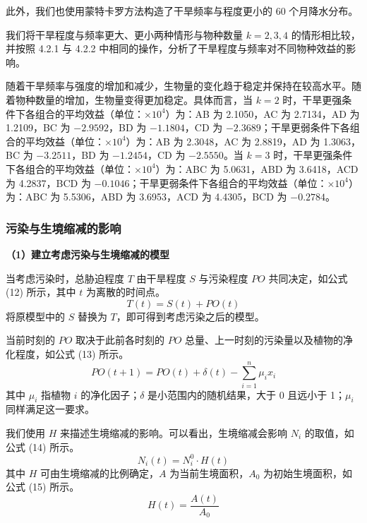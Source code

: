 \documentclass[11pt,a4paper]{ctexart}
\begin{document}
此外，我们也使用蒙特卡罗方法构造了干旱频率与程度更小的 60 个月降水分布。

我们将干旱程度与频率更大、更小两种情形与物种数量 $k=2,3,4$ 的情形相比较，并按照 4.2.1 与 4.2.2 中相同的操作，分析了干旱程度与频率对不同物种效益的影响。

随着干旱频率与强度的增加和减少，生物量的变化趋于稳定并保持在较高水平。随着物种数量的增加，生物量变得更加稳定。具体而言，当 $k=2$ 时，干旱更强条件下各组合的平均效益（单位：$\times10^{4}$）为：AB 为 2.1050，AC 为 2.7134，AD 为 1.2109，BC 为 $-2.9592$，BD 为 $-1.1804$，CD 为 $-2.3689$；干旱更弱条件下各组合的平均效益（单位：$\times10^{4}$）为：AB 为 2.3048，AC 为 2.8819，AD 为 1.3063，BC 为 $-3.2511$，BD 为 $-1.2454$，CD 为 $-2.5550$。当 $k=3$ 时，干旱更强条件下各组合的平均效益（单位：$\times10^{4}$）为：ABC 为 5.0631，ABD 为 3.6418，ACD 为 4.2837，BCD 为 $-0.1046$；干旱更弱条件下各组合的平均效益（单位：$\times10^{4}$）为：ABC 为 5.5306，ABD 为 3.6953，ACD 为 4.4305，BCD 为 $-0.2784$。

\subsubsection{污染与生境缩减的影响}

\textbf{（1）建立考虑污染与生境缩减的模型}

当考虑污染时，总胁迫程度 $T$ 由干旱程度 $S$ 与污染程度 $PO$ 共同决定，如公式 (12) 所示，其中 $t$ 为离散的时间点。
\begin{equation}
T(t)=S(t)+PO(t)
\end{equation}
将原模型中的 $S$ 替换为 $T$，即可得到考虑污染之后的模型。

当前时刻的 $PO$ 取决于此前各时刻的 $PO$ 总量、上一时刻的污染量以及植物的净化程度，如公式 (13) 所示。
\begin{equation}
PO(t+1)=PO(t)+\delta(t)-\sum_{i=1}^{n}\mu_i x_i
\end{equation}
其中 $\mu_i$ 指植物 $i$ 的净化因子；$\delta$ 是小范围内的随机结果，大于 0 且远小于 1；$\mu_i$ 同样满足这一要求。

我们使用 $H$ 来描述生境缩减的影响。可以看出，生境缩减会影响 $N_i$ 的取值，如公式 (14) 所示。
\begin{equation}
N_i(t)=N_i^{0}\cdot H(t)
\end{equation}
其中 $H$ 可由生境缩减的比例确定，$A$ 为当前生境面积，$A_0$ 为初始生境面积，如公式 (15) 所示。
\begin{equation}
H(t)=\frac{A(t)}{A_0}
\end{equation}
\end{document}
